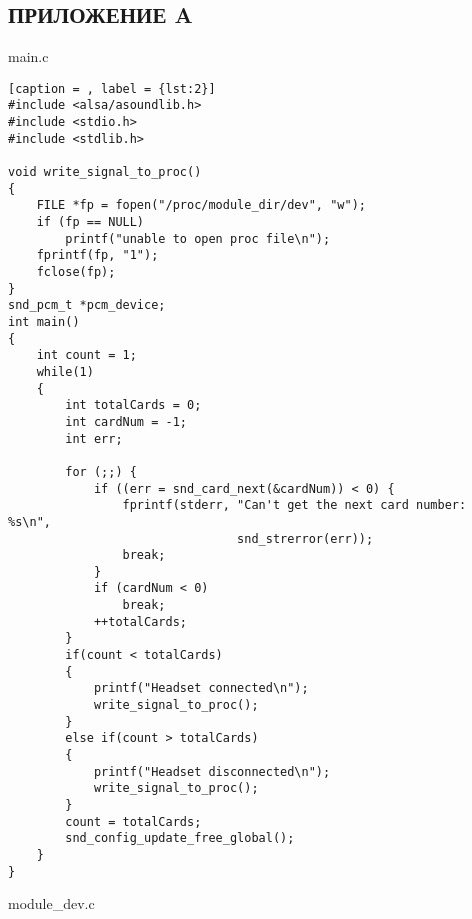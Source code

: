\begin{center}
    \section*{ПРИЛОЖЕНИЕ A}
\end{center}

main.c 
\begin{lstlisting}[caption = , label = {lst:2}]
#include <alsa/asoundlib.h>
#include <stdio.h>
#include <stdlib.h>

void write_signal_to_proc()
{
    FILE *fp = fopen("/proc/module_dir/dev", "w");
    if (fp == NULL)
        printf("unable to open proc file\n");
    fprintf(fp, "1");
    fclose(fp);
}
snd_pcm_t *pcm_device;
int main()
{
    int count = 1;
    while(1)
    {
        int totalCards = 0;  
        int cardNum = -1;  
        int err;

        for (;;) {
            if ((err = snd_card_next(&cardNum)) < 0) {
                fprintf(stderr, "Can't get the next card number: %s\n",
                                snd_strerror(err));
                break;
            }
            if (cardNum < 0)
                break;
            ++totalCards; 
        }
        if(count < totalCards)
        {
            printf("Headset connected\n");
            write_signal_to_proc();
        }
        else if(count > totalCards)
        {
            printf("Headset disconnected\n");
            write_signal_to_proc();
        }
        count = totalCards;
        snd_config_update_free_global();
    }
}
\end{lstlisting}

module\_dev.c

